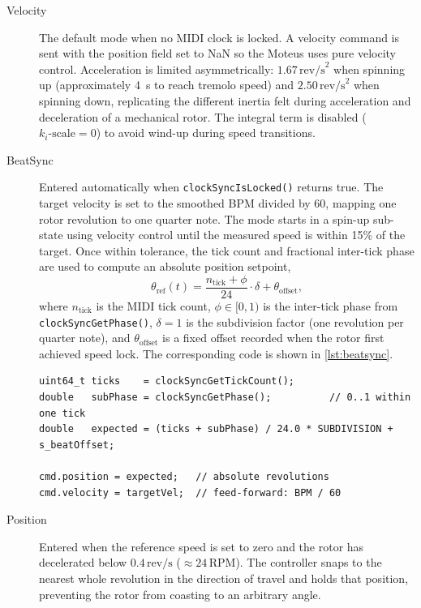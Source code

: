 \begin{description}
	\item[Velocity] The default mode when no MIDI clock is locked.
	      A velocity command is sent with the position field set to NaN so the Moteus uses
	      pure velocity control. Acceleration is limited asymmetrically:
	      $1.67\,\text{rev/s}^2$ when spinning up (approximately 4~s to reach tremolo speed)
	      and $2.50\,\text{rev/s}^2$ when spinning down,
	      replicating the different inertia felt during acceleration and deceleration of a
	      mechanical rotor.
	      The integral term is disabled ($k_i\text{-scale} = 0$) to avoid wind-up during
	      speed transitions.

	\item[BeatSync] Entered automatically when \texttt{clockSyncIsLocked()} returns true.
	      The target velocity is set to the smoothed BPM divided by 60,
	      mapping one rotor revolution to one quarter note.
	      The mode starts in a spin-up sub-state using velocity control until the measured
	      speed is within 15\% of the target.
	      Once within tolerance, the tick count and fractional inter-tick phase are used to
	      compute an absolute position setpoint,
	      \begin{equation}
		      \theta_\text{ref}(t) = \frac{n_\text{tick} + \phi}{24} \cdot \delta + \theta_\text{offset},
	      \end{equation}
	      where $n_\text{tick}$ is the MIDI tick count, $\phi \in [0,1)$ is the inter-tick phase
	      from \texttt{clockSyncGetPhase()}, $\delta = 1$ is the subdivision factor
	      (one revolution per quarter note), and $\theta_\text{offset}$ is a fixed offset recorded
	      when the rotor first achieved speed lock.
	      The corresponding code is shown in \autoref{lst:beatsync}.

	      \begin{listing}[H]
		      \begin{verbatim}
uint64_t ticks    = clockSyncGetTickCount();
double   subPhase = clockSyncGetPhase();          // 0..1 within one tick
double   expected = (ticks + subPhase) / 24.0 * SUBDIVISION + s_beatOffset;

cmd.position = expected;   // absolute revolutions
cmd.velocity = targetVel;  // feed-forward: BPM / 60
\end{verbatim}
		      \caption{Position setpoint computation in BeatSync mode.}
		      \label{lst:beatsync}
	      \end{listing}

	\item[Position] Entered when the reference speed is set to zero and the rotor has
	      decelerated below $0.4\,\text{rev/s}$ ($\approx 24\,\text{RPM}$).
	      The controller snaps to the nearest whole revolution in the direction of travel
	      and holds that position, preventing the rotor from coasting to an arbitrary angle.
\end{description}

